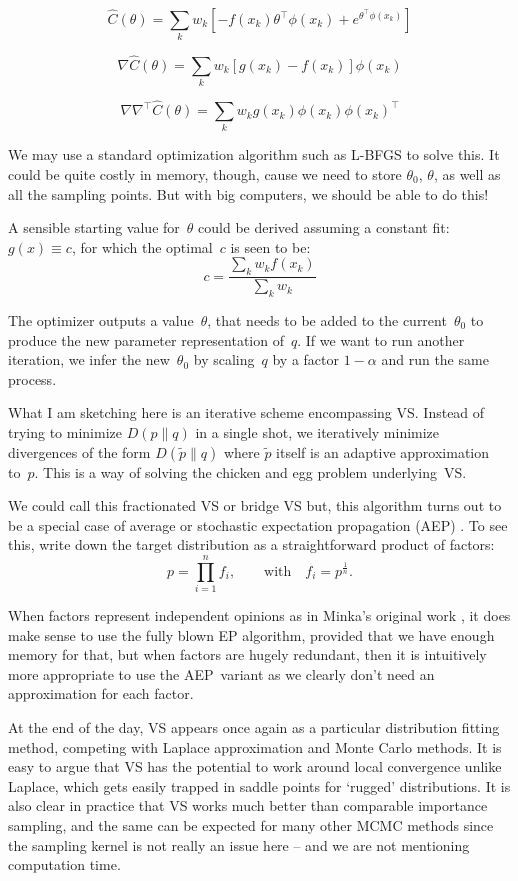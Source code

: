 \documentclass{article}
\begin{document}
$$
\hat{C}(\theta) = \sum_k w_k \left[
-f(x_k) \theta^\top\phi(x_k) + e^{\theta^\top \phi(x_k)}
\right]
$$

$$
\nabla \hat{C}(\theta) 
= \sum_k w_k 
[g(x_k) - f(x_k)] \phi(x_k)
$$

$$
\nabla\nabla^\top \hat{C}(\theta) 
= \sum_k w_k 
g(x_k) \phi(x_k)\phi(x_k)^\top
$$

We may use a standard optimization algorithm such as L-BFGS to solve this. It could be quite costly in memory, though, cause we need to store $\theta_0$, $\theta$, as well as all the sampling points. But with big computers, we should be able to do this!

A sensible starting value for~$\theta$ could be derived assuming a constant fit: $g(x)\equiv c$, for which the optimal~$c$ is seen to be:
$$
c = \frac{\sum_k w_k f(x_k)}{\sum_k w_k}
$$

The optimizer outputs a value~$\theta$, that needs to be added to the current~$\theta_0$ to produce the new parameter representation of~$q$. If we want to run another iteration, we infer the new~$\theta_0$ by scaling~$q$ by a factor $1-\alpha$ and run the same process.

What I am sketching here is an iterative scheme encompassing VS. Instead of trying to minimize $D(p\|q)$ in a single shot, we iteratively minimize divergences of the form $D(\tilde{p}\|q)$ where $\tilde{p}$ itself is an adaptive approximation to~$p$. This is a way of solving the chicken and egg problem underlying~VS. 

We could call this fractionated VS or bridge VS but, this algorithm turns out to be a special case of average or stochastic expectation propagation (AEP) \cite{Dehaene-18,Li-15}. To see this, write down the target distribution as a straightforward product of factors:
$$
p = \prod_{i=1}^n f_i,
\qquad\text{with}\quad
f_i = p^\frac{1}{n}.
$$

When factors represent independent opinions as in Minka's original work \cite{Minka-05}, it does make sense to use the fully blown EP algorithm, provided that we have enough memory for that, but when factors are hugely redundant, then it is intuitively more appropriate to use the AEP~variant as we clearly don't need an approximation for each factor.

At the end of the day, VS appears once again as a particular distribution fitting method, competing with Laplace approximation and Monte Carlo methods. It is easy to argue that VS has the potential to work around local convergence unlike Laplace, which gets easily trapped in saddle points for `rugged' distributions. It is also clear in practice that VS works much better than comparable importance sampling, and the same can be expected for many other MCMC methods since the sampling kernel is not really an issue here -- and we are not mentioning computation time. 
\end{document}
